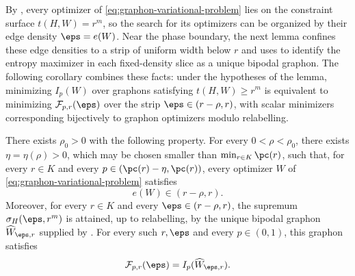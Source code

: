 By , every optimizer of \eqref{eq:graphon-variational-problem} lies on
the constraint surface $t(H,W)=r^m$, so the search for its optimizers can be
organized by their edge density $\eps=e(W)$.  Near the phase boundary, the
next lemma confines these edge densities to a strip of uniform width below
$r$ and uses
 to identify the entropy maximizer in each fixed-density slice
as a unique bipodal graphon.  The following corollary combines these facts: under
the hypotheses of the lemma, minimizing $I_p(W)$ over graphons satisfying
$t(H,W)\ge r^m$ is equivalent to minimizing $\mathcal F_{p,r}(\eps)$ over the
strip $\eps\in(r-\rho,r)$, with scalar minimizers corresponding bijectively to
graphon optimizers modulo relabelling.

\begin{lemma}\label{lem:fixed-density-bipodality}
There exists $\rho_0>0$ with the following property.  For every
$0<\rho<\rho_0$, there exists $\eta=\eta(\rho)>0$, which may be chosen smaller
than $\min_{r\in K}\pc(r)$, such that, for every $r\in K$ and every
$p \in (\pc(r)-\eta, \pc(r))$,
every optimizer $W$ of \eqref{eq:graphon-variational-problem} satisfies
\[
  e(W)\in(r-\rho,r).
\]
Moreover, for every $r\in K$ and every $\eps\in(r-\rho,r)$, the supremum
$\sigma_H(\eps, r^m)$ is attained, up to relabelling, by the unique bipodal
graphon $\widehat W_{\eps,r}$ supplied by .  For every such
$r,\eps$ and every $p\in(0,1)$, this graphon satisfies
\begin{equation}\label{eq:reduced-objective-attainment}
  \mathcal F_{p,r}(\eps)=I_p(\widehat W_{\eps,r}).
\end{equation}
\end{lemma}

